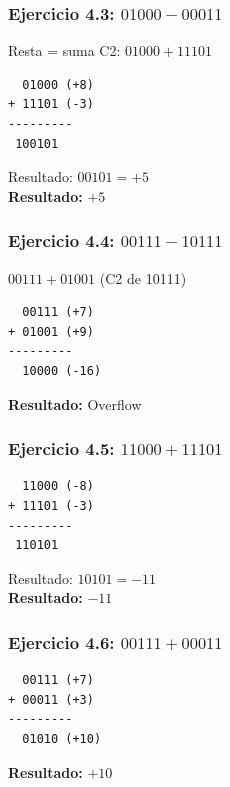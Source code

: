 \documentclass[12pt,a4paper]{article}
\begin{document}
\begin{minipage}[t]{0.48\textwidth}
\subsubsection{Ejercicio 4.3: $01000 - 00011$}
Resta = suma C2: $01000 + 11101$
\begin{verbatim}
  01000 (+8)
+ 11101 (-3)
---------
 100101
\end{verbatim}
Resultado: $00101 = +5$\\
\textbf{Resultado:} $+5$
\end{minipage}
\hfill
\begin{minipage}[t]{0.48\textwidth}
\subsubsection{Ejercicio 4.4: $00111 - 10111$}
$00111 + 01001$ (C2 de 10111)
\begin{verbatim}
  00111 (+7)
+ 01001 (+9)
---------
  10000 (-16)
\end{verbatim}
\textbf{Resultado:} Overflow
\end{minipage}

\vspace{0.5cm}

\begin{minipage}[t]{0.48\textwidth}
\subsubsection{Ejercicio 4.5: $11000 + 11101$}
\begin{verbatim}
  11000 (-8)
+ 11101 (-3)
---------
 110101
\end{verbatim}
Resultado: $10101 = -11$\\
\textbf{Resultado:} $-11$
\end{minipage}
\hfill
\begin{minipage}[t]{0.48\textwidth}
\subsubsection{Ejercicio 4.6: $00111 + 00011$}
\begin{verbatim}
  00111 (+7)
+ 00011 (+3)
---------
  01010 (+10)
\end{verbatim}
\textbf{Resultado:} $+10$
\end{minipage}

\vspace{0.5cm}
\end{document}
